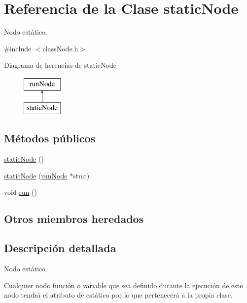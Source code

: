 \hypertarget{classstaticNode}{\section{Referencia de la Clase static\-Node}
\label{classstaticNode}
}


Nodo estático.  




{\ttfamily \#include $<$class\-Node.\-h$>$}

Diagrama de herencias de static\-Node\begin{figure}[H]
\begin{center}
\leavevmode
\includegraphics[height=2.000000cm]{classstaticNode}
\end{center}
\end{figure}
\subsection*{Métodos públicos}
\begin{DoxyCompactItemize}
\item 
\hyperlink{classstaticNode_ac2e0529cebb8df6e0ed7d73f58021c3a}{static\-Node} ()
\item 
\hyperlink{classstaticNode_a01257197b43f60ecf70fdde6fa31df2f}{static\-Node} (\hyperlink{classrunNode}{run\-Node} $\ast$stmt)
\item 
void \hyperlink{classstaticNode_a8ed0c090fc67d5a09aeaf32163ea4c49}{run} ()
\end{DoxyCompactItemize}
\subsection*{Otros miembros heredados}


\subsection{Descripción detallada}
Nodo estático. 

Cualquier nodo función o variable que sea definido durante la ejecución de este nodo tendrá el atributo de estático por lo que pertenecerá a la propia clase. 

